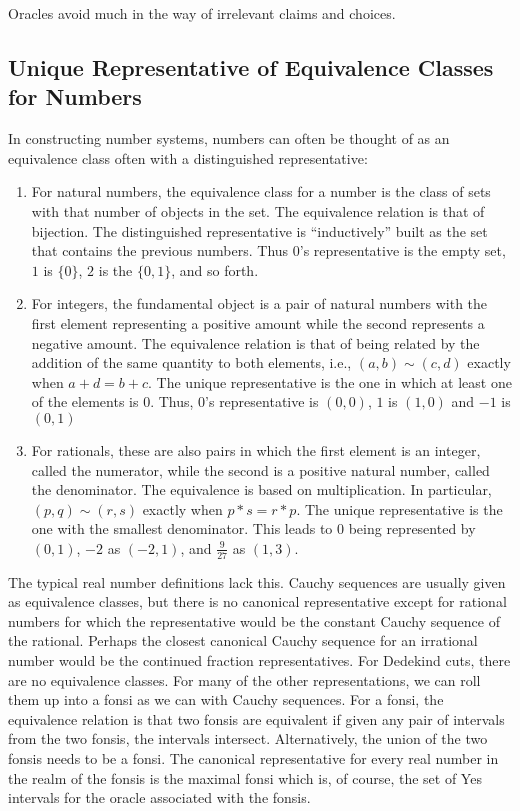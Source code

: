 \documentclass[12pt]{article}
\begin{document}
Oracles avoid much in the way of irrelevant claims and choices.


\subsection{Unique Representative of Equivalence Classes for Numbers}

In constructing number systems, numbers can often be thought of as an equivalence class often with a distinguished representative:

\begin{enumerate}
    \item For natural numbers, the equivalence class for a number is the class of sets with that number of objects in the set. The equivalence relation is that of bijection. The distinguished representative is ``inductively'' built as the set that contains the previous numbers. Thus $0$'s representative is the empty set, $1$ is $\{0\}$, $2$ is the $\{0,1\}$, and so forth. 
    \item For integers, the fundamental object is a pair of natural numbers with the first element representing a positive amount while the second represents a negative amount. The equivalence relation is that of being related by the addition of the same quantity to both elements, i.e., $(a,b) \sim (c,d)$ exactly when $a+d = b+c$. The unique representative is the one in which at least one of the elements is $0$. Thus, $0$'s representative  is $(0,0)$, $1$ is $(1,0)$ and $-1$ is $(0,1)$
    \item For rationals, these are also pairs in which the first element is an integer, called the numerator, while the second is a positive natural number, called the denominator. The equivalence is based on multiplication. In particular,  $(p,q) \sim (r,s)$ exactly when $p*s = r*p$. The unique representative is the one with the smallest denominator. This leads to $0$ being represented by $(0, 1)$, $-2$ as $(-2,1)$, and $\frac{9}{27}$ as $(1, 3)$. 
\end{enumerate}

The typical real number definitions lack this. Cauchy sequences are usually given as equivalence classes, but there is no canonical representative except for rational numbers for which the representative would be the constant Cauchy sequence of the rational. Perhaps the closest canonical Cauchy sequence for an irrational number would be the continued fraction representatives. For Dedekind cuts, there are no equivalence classes. For many of the other representations, we can roll them up into a fonsi as we can with Cauchy sequences. For a fonsi, the equivalence relation is that two fonsis are equivalent if given any pair of intervals from the two fonsis, the intervals intersect. Alternatively, the union of the two fonsis needs to be a fonsi. The canonical representative for every real number in the realm of the fonsis is the maximal fonsi which is, of course, the set of Yes intervals for the oracle associated with the fonsis.
\end{document}
